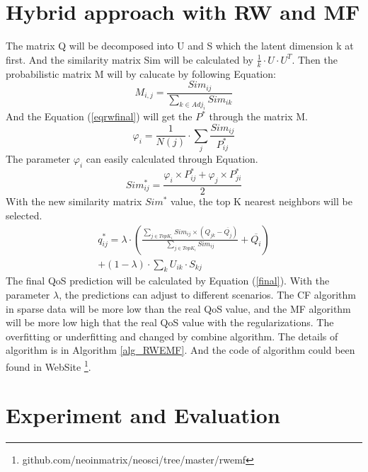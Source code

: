 \documentclass[conference]{IEEEtran}
\begin{document}
\section{Hybrid approach with RW and MF}\label{S-HRWMF}
\par The matrix Q will be decomposed into U and S which the latent dimension k at first. And the similarity matrix Sim will be calculated by $\frac{1}{k} \cdot U \cdot U^{T}$. Then the probabilistic matrix M will by calucate by following Equation:
\begin{equation}
M_{i,j}=\frac{Sim_{ij}}{\sum_{k \in Adj_{i}}{Sim_{ik}}}
\end{equation}
And the Equation (\ref{eqrwfinal}) will get the $P^{*}$ through the matrix M. 
\begin{equation}
\varphi_{i}=\frac{1}{N(j)} \cdot \sum_{j}{\frac{Sim_{ij}}{P^{*}_{ij}}} 
\end{equation}
The parameter $\varphi_{i}$ can easily calculated through Equation.
\begin{equation}
Sim_{ij}^{*}=\frac
{
\varphi_{i} \times P^{*}_{ij} + \varphi_{j} \times P^{*}_{ji}
}{2}
\end{equation}
With the new similarity matrix $Sim^{*}$ value, the top K nearest neighbors will be selected. 
\begin{equation}
\begin{aligned}
q_{ij}^{*}= \lambda \cdot (
\frac{
  \sum_{j \in TopK_{i}}{Sim_{ij} \times (Q_{jk}-\overline{Q_{j}})}
}{\sum_{j \in TopK_{i}}{Sim_{ij}}
}+\overline{Q_{i}}
) \\ + (1-\lambda) \cdot \sum_{k}U_{ik} \cdot S_{kj}
\label{final}
\end{aligned}
\end{equation}
The final QoS prediction will be calculated by Equation (\ref{final}). With the parameter $\lambda$, the predictions can adjust to different scenarios. The CF algorithm in sparse data will be more low than the real QoS value, and the MF algorithm will be more low high that the real QoS value with the regularizations. The overfitting or underfitting and changed by combine algorithm. The details of algorithm is in Algorithm \ref{alg_RWEMF}. And the code of algorithm could been found in WebSite \footnote{github.com/neoinmatrix/neosci/tree/master/rwemf}.

\section{Experiment and Evaluation}\label{S-EE}
\end{document}
